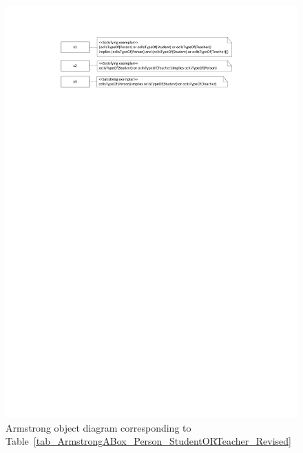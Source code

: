 \documentclass{amsart}
\begin{document}
    \begin{figure}
    \centering \includegraphics[trim = 20mm 235mm 42mm 20mm, clip, scale=0.9]{./ArmstrongOD_Person_StudentORTeacher_Revised.pdf}
    \caption{Armstrong object diagram corresponding to Table~\ref{tab_ArmstrongABox_Person_StudentORTeacher_Revised}}\label{fig_ArmstrongOD_Person_StudentORTeacher_Revised}
    \end{figure}      
   
\end{document}

